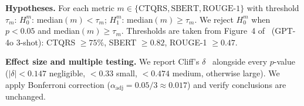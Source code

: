 \textbf{Hypotheses.}
For each metric $m \in \{\text{CTQRS}, \text{SBERT},
\text{ROUGE-1}\}$ with threshold $\tau_m$:
$H_0^m$: median$(m) < \tau_m$;
$H_1^m$: median$(m) \geq \tau_m$.
We reject $H_0^m$ when $p < 0.05$ and median$(m) \geq \tau_m$.
Thresholds are taken from Figure~4 of~\cite{acharya2025bugquality}
(GPT-4o 3-shot): CTQRS $\geq 75\%$, SBERT $\geq 0.82$,
ROUGE-1 $\geq 0.47$.

\textbf{Effect size and multiple testing.}
We report Cliff's $\delta$~\cite{arcuri2011practical}
alongside every $p$-value ($|\delta|<0.147$ negligible,
$<0.33$ small, $<0.474$ medium, otherwise large). We apply
Bonferroni correction ($\alpha_{\text{adj}} = 0.05/3
\approx 0.017$) and verify conclusions are unchanged.